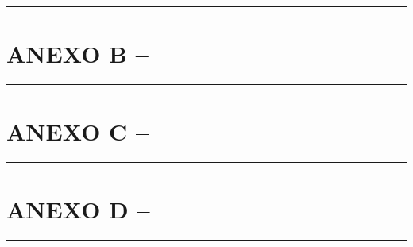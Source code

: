 \documentclass[a4paper,12pt]{article}
\begin{document}
\vspace{-0.8cm} %
    \rule{\textwidth}{2pt} %
    
\newpage

\section[\texorpdfstring{ANEXO B – [preencher com o texto descrevendo o indicador físico da atividade 1.n]}{ANEXO B – [preencher com o texto descrevendo o indicador físico da atividade 1.n]}]{ANEXO B – \color{blue}{[preencher com o texto descrevendo o indicador físico da atividade 1.n]}}
\vspace{-0.8cm} %
    \rule{\textwidth}{2pt} %

\newpage

\section[\texorpdfstring{ANEXO C – [preencher com o texto descrevendo o indicador físico da atividade 1.n]}{ANEXO C – [preencher com o texto descrevendo o indicador físico da atividade 1.n]}]{ANEXO C – \color{blue}{[preencher com o texto descrevendo o indicador físico da atividade 1.n]}}
\vspace{-0.8cm} %
    \rule{\textwidth}{2pt} %

\newpage

\section[\texorpdfstring{ANEXO D – [preencher com o texto descrevendo o indicador físico da atividade N.n]}{ANEXO D – [preencher com o texto descrevendo o indicador físico da atividade N.n]}]{ANEXO D – \color{blue}{[preencher com o texto descrevendo o indicador físico da atividade N.n]}}
\vspace{-0.8cm} %
    \rule{\textwidth}{2pt} %
\end{document}
